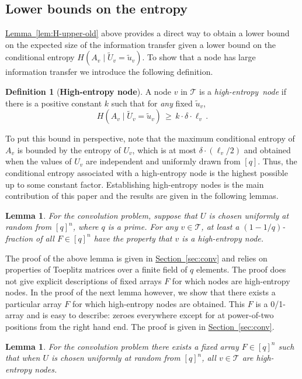 \documentclass[11pt]{article}
\numberwithin{equation}{section}
\newtheorem{lemma}[theorem]{Lemma}
\theoremstyle{definition}
\newtheorem{definition}[theorem]{Definition}
\theoremstyle{plain}
\newcommand{\expref}[2]{\hyperref[#2]{#1~\ref{#2}}}
\newcommand{\calT}{\ensuremath{\mathcal{T}}}
\newcommand{\lit}{large information transfer\xspace}
\newcommand{\Xv}{\ensuremath{U_v}}
\newcommand{\Xvknown}{\ensuremath{\widetilde{U}_v}}
\newcommand{\Xvfix}{\ensuremath{\widetilde{u}_v}}
\newcommand{\Yv}{\ensuremath{A_v}}
\begin{document}
\subsection{Lower bounds on the entropy}\label{sec:entropylower}

\expref{Lemma}{lem:H-upper-old} above provides a direct way to obtain a lower bound on the expected size of the information transfer given a lower bound on the conditional entropy $H(\Yv\mid\Xvknown=\Xvfix)$.
To show that a node has \lit we introduce the following definition.


\begin{definition}
	[\textbf{High-entropy node}]\label{def:high-node}A node $v$ in
	$\calT$ is a \emph{high-entropy~node} if there is a positive constant
	$k$ such that for \emph{any} fixed $\Xvfix$, 
	$$
	H(\Yv\mid\Xvknown=\Xvfix)\,\geq\, k\cdot\delta\cdot\ell_{v}\,.
	$$
\end{definition}

To put this bound in perspective, note that the maximum conditional
entropy of $\Yv$ is bounded by the entropy of $\Xv$, which is at
most $\delta\cdot(\ell_{v}/2)$ and obtained when the values of $\Xv$
are independent and uniformly drawn from $[q]$. Thus, the
conditional entropy associated with a high-entropy node is the highest
possible up to some constant factor.
Establishing high-entropy nodes is the main contribution of this paper and the results are given in the following lemmas.


\begin{lemma}
	\label{lem:conv-rand-H-lower}
	For the convolution problem,
	suppose that $U$ is chosen uniformly at random from $[q]^n$, where $q$ is a prime. For any $v \in \calT$, at least a $(1-{1}/{q})$-fraction of all $F \in [q]^n$ have the property that $v$ is a high-entropy node.
\end{lemma}

The proof of the above lemma is given in \expref{Section}{sec:conv} and relies on properties of Toeplitz matrices over a finite field of $q$ elements. The proof does not give explicit descriptions of fixed arrays $F$ for which nodes are high-entropy nodes. 
In the proof of the next lemma however, we show that there exists a particular array $F$ for which high-entropy nodes are obtained. This $F$ is a 0/1-array and is easy to describe: zeroes everywhere except for at power-of-two positions from the right hand end. The proof is given in \expref{Section}{sec:conv}.

\begin{lemma}
	\label{lem:conv-H-lower}
	For the convolution problem there exists a fixed array $F\in [q]^n$ such that when $U$ is chosen uniformly at random from $[q]^n$, all $v \in \calT$ are high-entropy nodes.
\end{lemma}
\end{document}
